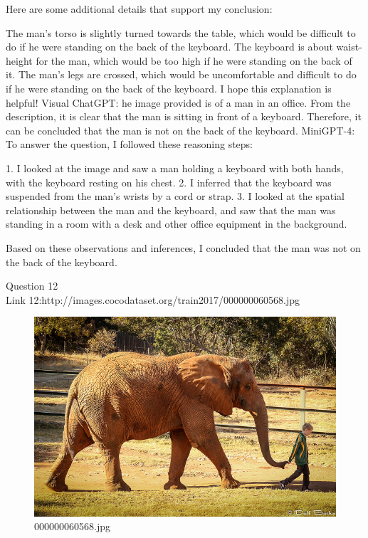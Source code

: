 \begin{enumerate}
        Here are some additional details that support my conclusion:
        
        The man's torso is slightly turned towards the table, which would be difficult to do if he were standing on the back of the keyboard.
        The keyboard is about waist-height for the man, which would be too high if he were standing on the back of it.
        The man's legs are crossed, which would be uncomfortable and difficult to do if he were standing on the back of the keyboard.
        I hope this explanation is helpful!
        \subitem Visual ChatGPT: he image provided is of a man in an office. From the description, it is clear that the man is sitting in front of a keyboard. Therefore, it can be concluded that the man is not on the back of the keyboard.
        \subitem MiniGPT-4: To answer the question, I followed these reasoning steps:

        1. I looked at the image and saw a man holding a keyboard with both hands, with the keyboard resting on his chest.
        2. I inferred that the keyboard was suspended from the man’s wrists by a cord or strap.
        3. I looked at the spatial relationship between the man and the keyboard, and saw that the man was standing in a room with a desk and other office equipment in the background.
        
        Based on these observations and inferences, I concluded that the man was not on the back of the keyboard.
    \end{enumerate}
Question 12\\
Link 12:http://images.cocodataset.org/train2017/000000060568.jpg
    \begin{figure}[h]
        \centering
        \includegraphics[width=0.8\linewidth]{../image set/easy/000000060568.jpg}
        \caption{000000060568.jpg}
    \end{figure}
